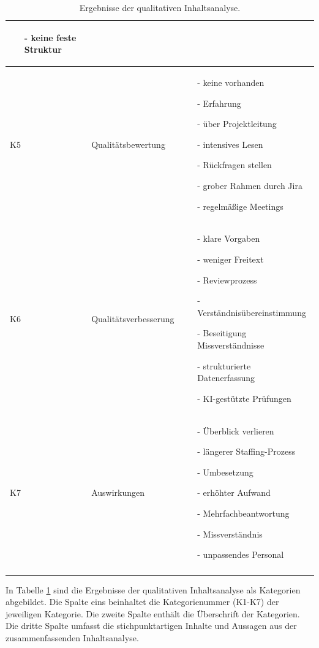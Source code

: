 \begin{longtable}{| p{0.5cm} | p{4cm} | p{8.5cm} |}
\begin{itemize}
		\item[-] keine feste Struktur
	\end{itemize}\\
	\hline
	K5 & Qualitätsbewertung & \begin{itemize}
		\item[-] keine vorhanden
		\item[-] Erfahrung
		\item[-] über Projektleitung
		\item[-] intensives Lesen
		\item[-] Rückfragen stellen
		\item[-] grober Rahmen durch Jira
		\item[-] regelmäßige Meetings
	\end{itemize}\\
	\hline
	K6 & Qualitätsverbesserung & \begin{itemize}
		\item[-] klare Vorgaben
		\item[-] weniger Freitext
		\item[-] Reviewprozess
		\item[-] Verständnisübereinstimmung
		\item[-] Beseitigung Missverständnisse
		\item[-] strukturierte Datenerfassung
		\item[-] KI-gestützte Prüfungen
	\end{itemize}\\
	\hline
	K7 & Auswirkungen & \begin{itemize}
		\item[-] Überblick verlieren
		\item[-] längerer Staffing-Prozess
		\item[-] Umbesetzung
		\item[-] erhöhter Aufwand
		\item[-] Mehrfachbeantwortung
		\item[-] Missverständnis
		\item[-] unpassendes Personal
	\end{itemize}\\
	\hline
	\caption{Ergebnisse der qualitativen Inhaltsanalyse.}
	\label{tab:kategorientabelle}
\end{longtable}
In Tabelle \ref{tab:kategorientabelle} sind die Ergebnisse der qualitativen Inhaltsanalyse als Kategorien abgebildet. Die Spalte eins beinhaltet die Kategorienummer (K1-K7) der jeweiligen Kategorie. Die zweite Spalte enthält die Überschrift der Kategorien. Die dritte Spalte umfasst die stichpunktartigen Inhalte und Aussagen aus der zusammenfassenden Inhaltsanalyse.
